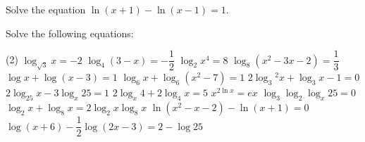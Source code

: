 \documentclass{report}
\begin{document}
        Solve the equation $\ln (x+1)-\ln (x-1)=1$.

        Solve the following equations:
        \begin{tasks}[label=\arabic*.](2)
                \task $\log _{\sqrt{3}} x=-2$
                \task $\log _4(3-x)=-\dfrac{1}{2}$
                \task $\log _2 x^4=8$
                \task $\log _8\left(x^2-3 x-2\right)=\dfrac{1}{3}$
                \task $\log x+\log (x-3)=1$
                \task $\log _6 x+\log _6\left(x^2-7\right)=1$
                \task $2 \log _3{ }^2 x+\log _3 x-1=0$
                \task $2 \log _{25} x-3 \log _x 25=1$
                \task $2 \log _x 4+2 \log _4 x=5$
                \task $x^{2 \ln x}=e x$
                \task $\log _3 \log _2 \log _x 25=0$
                \task $\log _2 x+\log _8 x=2 \log _2 x \log _8 x$
                \task $\ln \left(x^2-x-2\right)-\ln (x+1)=0$
                \task $\log (x+6)-\dfrac{1}{2} \log (2 x-3)=2-\log 25$
        \end{tasks}
\end{document}
